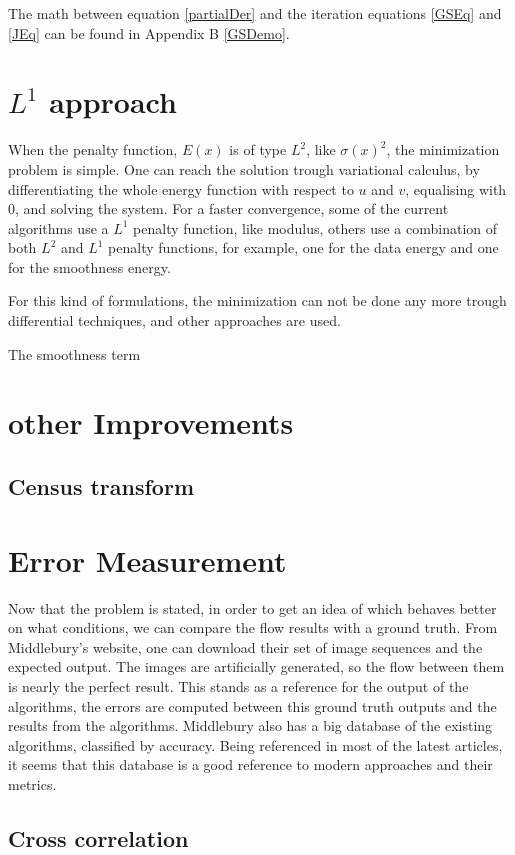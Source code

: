 \documentclass[12pt,a4paper,twoside]{report}
\begin{document}
The math between equation \ref{partialDer} and the iteration equations \ref{GSEq} and \ref{JEq} can be found in Appendix B \ref{GSDemo}.


\section{$L^1$ approach}

When the penalty function, $E(x)$ is of type $L^2$, like $\sigma(x)^2$,  the minimization problem is simple. One can reach the solution trough variational calculus, by differentiating the whole energy function with respect to $u$ and $v$, equalising with 0, and solving the system.  
For a faster convergence, some of the current algorithms use a $L^1$ penalty function, like modulus, others use a combination of both $L^2$ and $L^1$ penalty functions, for example, one for the data energy and one for the smoothness energy.

For this kind of formulations, the minimization can not be done any more trough differential techniques, and other approaches are used.

The smoothness term 

\section{other Improvements}
\subsection{Census transform}
\section{Error Measurement}
Now that the problem is stated, in order to get an idea of which behaves better on what conditions, we can compare the flow results with a ground truth. From Middlebury's website\cite{middleburry}, one can download their set of image sequences and the expected output. The images are artificially generated, so the flow between them is nearly the perfect result. This stands as a reference for the output of the algorithms, the errors are computed between this ground truth outputs and the results from the algorithms. Middlebury \cite{middleburry} also has a big database of the existing algorithms, classified by accuracy. Being referenced in most of the latest articles, it seems that this database is a good reference to modern approaches and their metrics.

\subsection{Cross correlation}
\end{document}
